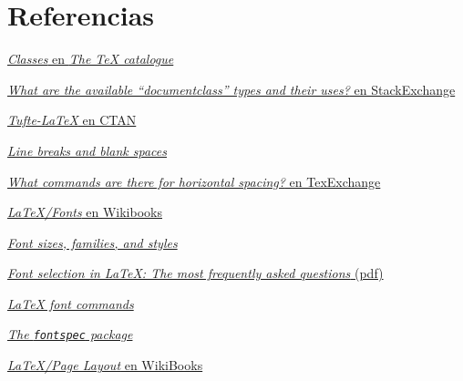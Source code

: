\section{Referencias}\label{sec:referencias7}

\href{http://texcatalogue.ctan.org/bytopic.html\#classes}{\emph{Classes}
en \emph{The TeX catalogue}}

\href{http://tex.stackexchange.com/questions/782/what-are-the-available-documentclass-types-and-their-uses}{\emph{What
are the available ``documentclass'' types and their uses?} en
StackExchange}

\href{http://www.ctan.org/pkg/tufte-latex}{\emph{Tufte-LaTeX} en CTAN}

\href{https://www.sharelatex.com/learn/Line_breaks_and_blank_spaces}{\emph{Line
breaks and blank spaces}}

\href{http://tex.stackexchange.com/questions/74353/what-commands-are-there-for-horizontal-spacing\#74354}{\emph{What
commands are there for horizontal spacing?} en TexExchange}

\href{https://en.wikibooks.org/wiki/LaTeX/Fonts}{\emph{LaTeX/Fonts} en
Wikibooks}

\href{https://www.sharelatex.com/learn/Font_sizes,_families,_and_styles}{\emph{Font
sizes, families, and styles}}

\href{https://www.tug.org/pracjourn/2006-1/schmidt/schmidt.pdf}{\emph{Font
selection in LaTeX: The most frequently asked questions} (pdf)}

\href{http://www.cl.cam.ac.uk/\%7Erf10/pstex/latexcommands.htm}{\emph{LaTeX
font commands}}

\href{https://github.com/wspr/fontspec}{\emph{The \lstinline!fontspec!
package}}

\href{https://en.wikibooks.org/wiki/LaTeX/Page_Layout\#Margins}{\emph{LaTeX/Page
Layout} en WikiBooks}
